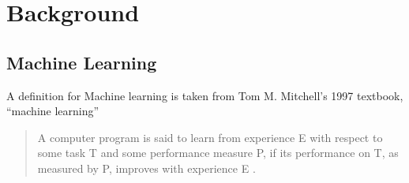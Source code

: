 \documentclass{UoNMCHA}
\newcommand{\inlineQuote}[1]{``#1''}
\newcommand{\sref}[1] {Section \ref{#1}}
\numberwithin{equation}{section}
\begin{document}


%
\section{Background}

\subsection{Machine Learning}
A definition for Machine learning is taken from Tom M. Mitchell's 1997 textbook, \inlineQuote{machine learning}
\begin{quote}
    A computer program is said to learn from experience E with respect to some task T and some performance measure P, if its performance on T, as measured by P, improves with experience E \cite{Mitchell1997}.
\end{quote}
\end{document}
